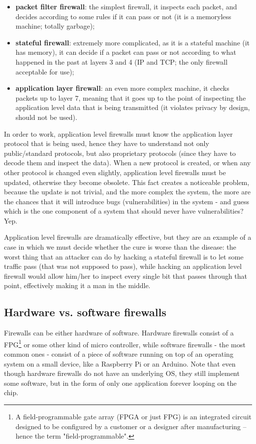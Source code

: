 \begin{itemize}
    \item \textbf{packet filter firewall}: the simplest firewall, it inspects each packet, and decides according to some rules if it can pass or not (it is a memoryless machine; totally garbage);
    \item \textbf{stateful firewall}: extremely more complicated, as it is a stateful machine (it has memory), it can decide if a packet can pass or not according to what happened in the past at layers 3 and 4 (IP and TCP; the only firewall acceptable for use);
    \item \textbf{application layer firewall}: an even more complex machine, it checks packets up to layer 7, meaning that it goes up to the point of inspecting the application level data that is being transmitted (it violates privacy by design, should not be used).
\end{itemize}

In order to work, application level firewalls must know the application layer protocol that is being used, hence they have to understand not only public/standard protocols, but also proprietary protocols (since they have to decode them and inspect the data). When a new protocol is created, or when any other protocol is changed even slightly, application level firewalls must be updated, otherwise they become obsolete. This fact creates a noticeable problem, because the update is not trivial, and the more complex the system, the more are the chances that it will introduce bugs (vulnerabilities) in the system - and guess which is the one component of a system that should never have vulnerabilities? Yep.

Application level firewalls are dramatically effective, but they are an example of a case in which we must decide whether the cure is worse than the disease: the worst thing that an attacker can do by hacking a stateful firewall is to let some traffic pass (that was not supposed to pass), while hacking an application level firewall would allow him/her to inspect every single bit that passes through that point, effectively making it a man in the middle.


\subsection*{Hardware vs. software firewalls}
Firewalls can be either hardware of software. Hardware firewalls consist of a FPG\footnote{A field-programmable gate array (FPGA or just FPG) is an integrated circuit designed to be configured by a customer or a designer after manufacturing – hence the term "field-programmable".} or some other kind of micro controller, while software firewalls - the most common ones - consist of a piece of software running on top of an operating system on a small device, like a Raspberry Pi or an Arduino. Note that even though hardware firewalls do not have an underlying OS, they still implement some software, but in the form of only one application forever looping on the chip.

